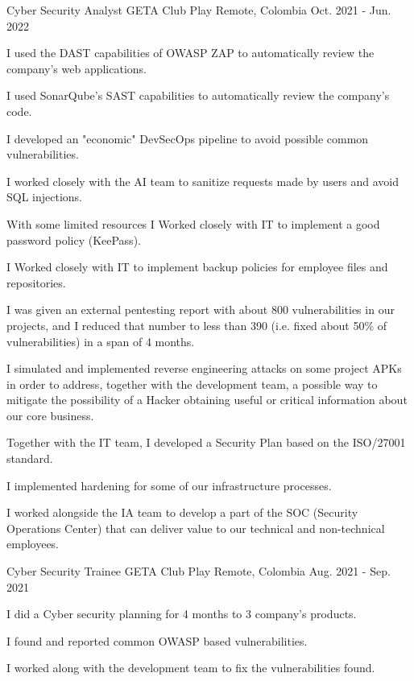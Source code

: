 \begin{cventries}
  \cventry
  {Cyber Security Analyst} %
  {GETA Club Play} %
  {Remote, Colombia} %
  {Oct. 2021 - Jun. 2022} %
  {
    \begin{cvitems} %
      \item {I used the DAST capabilities of OWASP ZAP to automatically review the company's web
                  applications.}
      \item {I used SonarQube's SAST capabilities to automatically review the company's code.}
      \item {I developed an "economic" DevSecOps pipeline to avoid possible common
                  vulnerabilities.}
      \item {I worked closely with the AI team to sanitize requests made by users and avoid SQL
                  injections.}
      \item {With some limited resources I Worked closely with IT to implement a good password
                  policy (KeePass).}
      \item {I Worked closely with IT to implement backup policies for employee files and
                  repositories.}
      \item {I was given an external pentesting report with about 800 vulnerabilities in our
                  projects, and I reduced that number to less than 390 (i.e. fixed about 50\% of
                  vulnerabilities) in a span of 4 months.}
      \item {I simulated and implemented reverse engineering attacks on some project APKs in order
                  to address, together with the development team, a possible way to mitigate the possibility
                  of a Hacker obtaining useful or critical information about our core business.}
      \item {Together with the IT team, I developed a Security Plan based on the ISO/27001
                  standard.}
      \item {I implemented hardening for some of our infrastructure processes.}
      \item {I worked alongside the IA team to develop a part of the SOC (Security Operations
                  Center) that can deliver value to our technical and non-technical employees.}
    \end{cvitems}
  }

  \cventry
  {Cyber Security Trainee} %
  {GETA Club Play} %
  {Remote, Colombia} %
  {Aug. 2021 - Sep. 2021} %
  {
    \begin{cvitems} %
      \item {I did a Cyber security planning for 4 months to 3 company's products.}
      \item {I found and reported common OWASP based vulnerabilities.}
      \item {I worked along with the development team to fix the vulnerabilities found.}
    \end{cvitems}
  }


\end{cventries}
